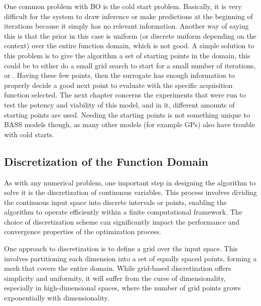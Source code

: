 One common problem with BO is the cold start problem. Basically, it is very difficult for the system to draw inference or make predictions at the beginning of iterations because it simply has no relevant information. Another way of saying this is that the prior in this case is uniform (or discrete uniform depending on the context) over the entire function domain, which is not good. A simple solution to this problem is to give the algorithm a set of starting points in the domain, this could be to either do a small grid search to start for a small number of iterations, or . Having these few points, then the surrogate has enough information to properly decide a good next point to evaluate with the specific acquisition function selected. The next chapter concerns the experiments that were run to test the potency and viability of this model, and in it, different amounts of starting points are used. Needing the starting points is not something unique to BASS models though, as many other models (for example GPs) also have trouble with cold starts.  

\subsection{Discretization of the Function Domain}

As with any numerical problem, one important step in designing the algorithm to solve it is the discretization of continuous variables. This process involves dividing the continuous input space into discrete intervals or points, enabling the algorithm to operate efficiently within a finite computational framework. The choice of discretization scheme can significantly impact the performance and convergence properties of the optimization process.

One approach to discretization is to define a grid over the input space. This involves partitioning each dimension into a set of equally spaced points, forming a mesh that covers the entire domain. While grid-based discretization offers simplicity and uniformity, it will suffer from the curse of dimensionality, especially in high-dimensional spaces, where the number of grid points grows exponentially with dimensionality.

